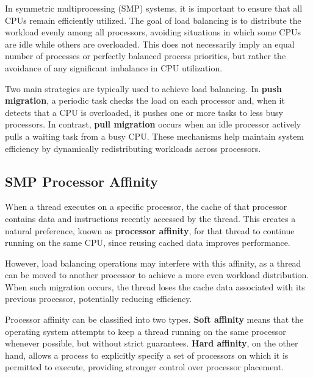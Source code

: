 In symmetric multiprocessing (SMP) systems, it is important to ensure that all CPUs remain efficiently utilized.  
The goal of load balancing is to distribute the workload evenly among all processors, avoiding situations in which some CPUs are idle while others are overloaded.  
This does not necessarily imply an equal number of processes or perfectly balanced process priorities, but rather the avoidance of any significant imbalance in CPU utilization.

Two main strategies are typically used to achieve load balancing.  
In \textbf{push migration}, a periodic task checks the load on each processor and, when it detects that a CPU is overloaded, it pushes one or more tasks to less busy processors.  
In contrast, \textbf{pull migration} occurs when an idle processor actively pulls a waiting task from a busy CPU.  
These mechanisms help maintain system efficiency by dynamically redistributing workloads across processors.

\subsection{SMP Processor Affinity}

When a thread executes on a specific processor, the cache of that processor contains data and instructions recently accessed by the thread.  
This creates a natural preference, known as \textbf{processor affinity}, for that thread to continue running on the same CPU, since reusing cached data improves performance.  

However, load balancing operations may interfere with this affinity, as a thread can be moved to another processor to achieve a more even workload distribution.  
When such migration occurs, the thread loses the cache data associated with its previous processor, potentially reducing efficiency.

Processor affinity can be classified into two types.  
\textbf{Soft affinity} means that the operating system attempts to keep a thread running on the same processor whenever possible, but without strict guarantees.  
\textbf{Hard affinity}, on the other hand, allows a process to explicitly specify a set of processors on which it is permitted to execute, providing stronger control over processor placement.

